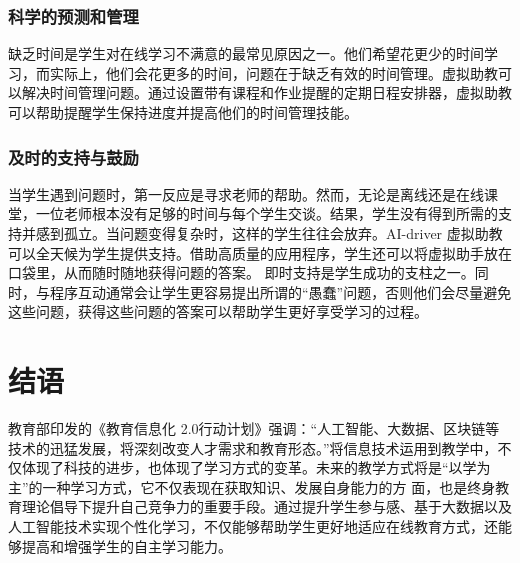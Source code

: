 \documentclass[UTF8]{ctexart}
\begin{document}
		\subsubsection{科学的预测和管理}
		缺乏时间是学生对在线学习不满意的最常见原因之一。他们希望花更少的时间学习，而实际上，他们会花更多的时间，问题在于缺乏有效的时间管理。虚拟助教可以解决时间管理问题。通过设置带有课程和作业提醒的定期日程安排器，虚拟助教可以帮助提醒学生保持进度并提高他们的时间管理技能。
		\subsubsection{及时的支持与鼓励}
		当学生遇到问题时，第一反应是寻求老师的帮助。然而，无论是离线还是在线课堂，一位老师根本没有足够的时间与每个学生交谈。结果，学生没有得到所需的支持并感到孤立。当问题变得复杂时，这样的学生往往会放弃。AI-driver 虚拟助教可以全天候为学生提供支持。借助高质量的应用程序，学生还可以将虚拟助手放在口袋里，从而随时随地获得问题的答案。
		即时支持是学生成功的支柱之一。同时，与程序互动通常会让学生更容易提出所谓的“愚蠢”问题，否则他们会尽量避免这些问题，获得这些问题的答案可以帮助学生更好享受学习的过程。
	
	\section{结语}
	教育部印发的《教育信息化 2.0行动计划》强调：“人工智能、大数据、区块链等技术的迅猛发展，将深刻改变人才需求和教育形态。”将信息技术运用到教学中，不仅体现了科技的进步，也体现了学习方式的变革。未来的教学方式将是“以学为主”的一种学习方式，它不仅表现在获取知识、发展自身能力的方
	面，也是终身教育理论倡导下提升自己竞争力的重要手段。通过提升学生参与感、基于大数据以及人工智能技术实现个性化学习，不仅能够帮助学生更好地适应在线教育方式，还能够提高和增强学生的自主学习能力。
\end{document}
